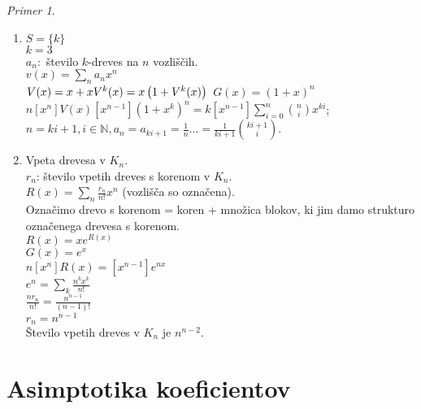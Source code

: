 \documentclass[a4paper, 12pt]{book}
\theoremstyle{definition}
\theoremstyle{remark}
\newtheorem*{ex}{Primer}
\newcommand{\N}{\mathbb{N}}
\begin{document}
\begin{ex} \text{} \\
  \begin{enumerate}[label=(\alph*)]
    \item $S = \{k\}$ \\
      $k = 3$ \\
      $a_n:$ število $k$-dreves na $n$ vozliščih. \\
      $v(x) = \sum_n a_n x^n$ \\
      $V(x) = x + x V^k(x) = x \left(1 + V^k(x)\right) \\$
      $G(x) = (1+x)^n$ \\
      $n [x^n] V(x) [x^{n-1}] \left(1 + x^k\right)^n = k [x^{n-1}] \sum_{i=0}^{n} \binom{n}{i} x^{ki}$; \\
      $n = ki + 1, i \in \N, a_n = a_{ki+1} = \frac{1}{n} \dots = \frac{1}{ki+1} \binom{ki+1}{i}$.
    \item Vpeta drevesa v $K_n$. \\
      $r_n$: število vpetih dreves s korenom v $K_n$. \\
      $R(x) = \sum_n \frac{r_n}{n!} x^n$ (vozlišča so označena). \\
      Označimo drevo s korenom = koren + množica blokov, ki jim damo strukturo označenega drevesa s korenom. \\
      $R(x) = x e^{R(x)}$ \\
      $G(x) = e^x$ \\
      $n [x^n] R(x) = [x^{n-1}] e^{nx}$ \\
      $e^n = \sum_k \frac{n^k x^k}{n!}$ \\
      $\frac{n r_n}{n!} = \frac{n^{n-1}}{(n-1)!}$ \\
      $r_n = n^{n-1}$ \\
      Število vpetih dreves v $K_n$ je $n^{n-2}$. 
  \end{enumerate}
\end{ex}


\section{Asimptotika koeficientov}
\end{document}
